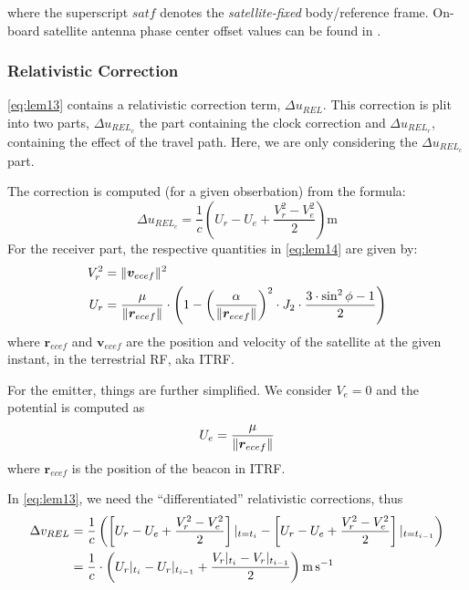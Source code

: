 where the superscript $satf$ denotes the \emph{satellite-fixed} body/reference 
frame. On-board satellite antenna phase center offset values can be found in 
\cite{DorisSatModels}.

\subsubsection{Relativistic Correction}
\label{sssec:relativistic-correction}
\ref{eq:lem13} contains a relativistic correction term, $\Delta u_{REL}$. This 
correction is plit into two parts, $\Delta u_{REL_c}$ the part containing the 
clock correction and $\Delta u_{REL_r}$, containing the effect of the travel 
path. Here, we are only considering the $\Delta u_{REL_c}$ part.

The correction is computed (for a given obserbation) from the formula:
\begin{equation}
  \Delta u_{REL_c} = \frac{1}{c} \left( U_r - U_e + \frac{V^2_r - V^2_e}{2} \right) \si{\m}
  \label{eq:lem14}
\end{equation}
For the receiver part, the respective quantities in \ref{eq:lem14} are given by:
\begin{equation}
  \begin{aligned}
    V^2_r &= \lVert\bm{v}_{ecef}\rVert^2 \\
    U_r   &= \frac{\mu}{\lVert\bm{r}_{ecef}\rVert} \cdot \left( 1 - 
      \left(\frac{\alpha}{\lVert\bm{r}_{ecef}\rVert}\right) ^2 \cdot J_2 \cdot
        \frac{3 \cdot \sin ^2{\phi} -1}{2} \right)
  \end{aligned}
  \label{eq:potential-receiver}
\end{equation}
where $\bm{r}_{ecef}$ and $\bm{v}_{ecef}$ are the position and velocity of the 
satellite at the given instant, in the terrestrial RF, aka ITRF.

For the emitter, things are further simplified. We consider $V_e = 0$ and the 
potential is computed as 
\begin{equation}
  U_e = \frac{\mu}{\lVert\bm{r}_{ecef}\rVert}
  \label{eq:potential-emitter}
\end{equation}
where $\bm{r}_{ecef}$ is the position of the beacon in ITRF.

In \ref{eq:lem13}, we need the ``differentiated'' relativistic corrections, thus 
\begin{equation}
  \label{eq:drel-diff}
  \begin{aligned}
    \Delta v_{REL} &= \frac{1}{c} \left( \left[ U_r - U_e + \frac{V^2_r - V^2_e}{2} \right]\at{t=t_i} - \left[ U_r - U_e + \frac{V^2_r - V^2_e}{2} \right]\at{t=t_{i-1}} \right) \\
      &= \frac{1}{c} \cdot \left( U_r\at{t_i} - U_r\at{t_{i-1}} +  \frac{V_r\at{t_i}-V_r\at{t_{i-1}}}{2} \right) \si{\m\per\s}
  \end{aligned}
\end{equation}

